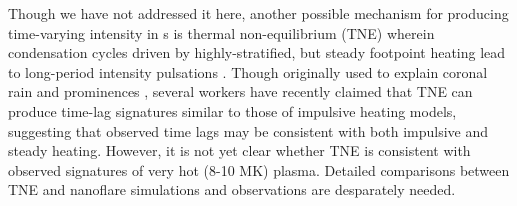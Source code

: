 Though we have not addressed it here, another possible mechanism for producing time-varying intensity in \AR s is thermal non-equilibrium (TNE) wherein condensation cycles driven by highly-stratified, but steady footpoint heating lead to long-period intensity pulsations \citep{kuin_thermal_1982}. Though originally used to explain coronal rain \citep{antolin_coronal_2010,antolin_multithermal_2015,auchere_coronal_2018} and prominences \citep{antiochos_model_1991}, several workers \citep{mok_three-dimensional_2016,winebarger_investigation_2016,froment_long-period_2017,winebarger_identifying_2018,froment_occurrence_2018} have recently claimed that TNE can produce time-lag signatures similar to those of impulsive heating models, suggesting that observed time lags may be consistent with both impulsive and steady heating. However, it is not yet clear whether TNE is consistent with observed signatures of very hot (8-10 MK) plasma. Detailed comparisons between TNE and nanoflare simulations and observations are desparately needed.

